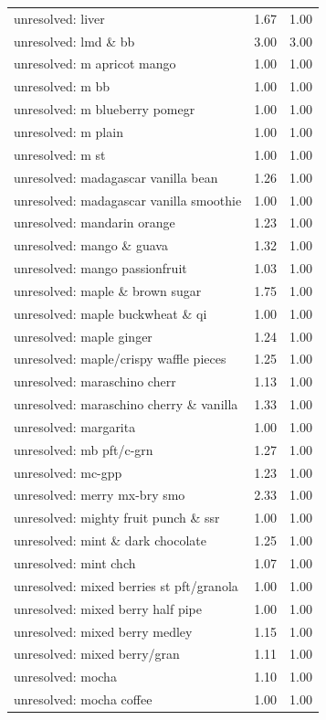 \begin{table}
\begin{tabular}{lrr}
unresolved: liver & 1.67 & 1.00 \\
unresolved: lmd \& bb & 3.00 & 3.00 \\
unresolved: m apricot mango & 1.00 & 1.00 \\
unresolved: m bb & 1.00 & 1.00 \\
unresolved: m blueberry pomegr & 1.00 & 1.00 \\
unresolved: m plain & 1.00 & 1.00 \\
unresolved: m st & 1.00 & 1.00 \\
unresolved: madagascar vanilla bean & 1.26 & 1.00 \\
unresolved: madagascar vanilla smoothie & 1.00 & 1.00 \\
unresolved: mandarin orange & 1.23 & 1.00 \\
unresolved: mango \& guava & 1.32 & 1.00 \\
unresolved: mango passionfruit & 1.03 & 1.00 \\
unresolved: maple \& brown sugar & 1.75 & 1.00 \\
unresolved: maple buckwheat \& qi & 1.00 & 1.00 \\
unresolved: maple ginger & 1.24 & 1.00 \\
unresolved: maple/crispy waffle pieces & 1.25 & 1.00 \\
unresolved: maraschino cherr & 1.13 & 1.00 \\
unresolved: maraschino cherry \& vanilla & 1.33 & 1.00 \\
unresolved: margarita & 1.00 & 1.00 \\
unresolved: mb pft/c-grn & 1.27 & 1.00 \\
unresolved: mc-gpp & 1.23 & 1.00 \\
unresolved: merry mx-bry smo & 2.33 & 1.00 \\
unresolved: mighty fruit punch \& ssr & 1.00 & 1.00 \\
unresolved: mint \& dark chocolate & 1.25 & 1.00 \\
unresolved: mint chch & 1.07 & 1.00 \\
unresolved: mixed berries st pft/granola & 1.00 & 1.00 \\
unresolved: mixed berry half pipe & 1.00 & 1.00 \\
unresolved: mixed berry medley & 1.15 & 1.00 \\
unresolved: mixed berry/gran & 1.11 & 1.00 \\
unresolved: mocha & 1.10 & 1.00 \\
unresolved: mocha coffee & 1.00 & 1.00 \\

\end{tabular}
\end{table}
